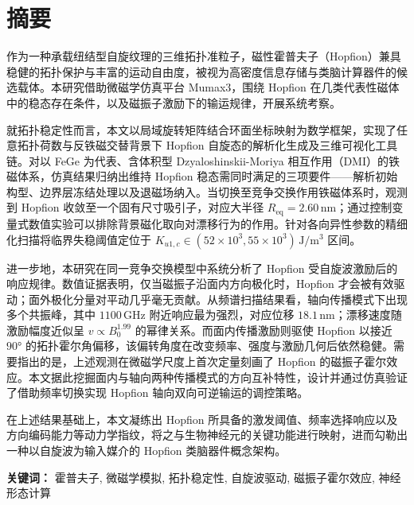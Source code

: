 \documentclass{article}
\begin{document}
\section*{摘\quad 要}

作为一种承载纽结型自旋纹理的三维拓扑准粒子，磁性霍普夫子（Hopfion）兼具稳健的拓扑保护与丰富的运动自由度，被视为高密度信息存储与类脑计算器件的候选载体。本研究借助微磁学仿真平台 Mumax3，围绕 Hopfion 在几类代表性磁体中的稳态存在条件，以及磁振子激励下的输运规律，开展系统考察。

就拓扑稳定性而言，本文以局域旋转矩阵结合环面坐标映射为数学框架，实现了任意拓扑荷数与反铁磁交替背景下 Hopfion 自旋态的解析化生成及三维可视化工具链。对以 FeGe 为代表、含体积型 Dzyaloshinskii-Moriya 相互作用（DMI）的铁磁体系，仿真结果归纳出维持 Hopfion 稳态需同时满足的三项要件——解析初始构型、边界层冻结处理以及退磁场纳入。当切换至竞争交换作用铁磁体系时，观测到 Hopfion 收敛至一个固有尺寸吸引子，对应大半径 $R_{\text{eq}} = 2.60\,\mathrm{nm}$；通过控制变量式数值实验可以排除背景磁化取向对漂移行为的作用。针对各向异性参数的精细化扫描将临界失稳阈值定位于 $K_{u1,c} \in (52\times10^{3}, 55\times10^{3}) \, \mathrm{J/m^3}$ 区间。

进一步地，本研究在同一竞争交换模型中系统分析了 Hopfion 受自旋波激励后的响应规律。数值证据表明，仅当磁振子沿面内方向极化时，Hopfion 才会被有效驱动；面外极化分量对平动几乎毫无贡献。从频谱扫描结果看，轴向传播模式下出现多个共振峰，其中 $1100\,\mathrm{GHz}$ 附近响应最为强烈，对应位移 $18.1\,\mathrm{nm}$；漂移速度随激励幅度近似呈 $v \propto B_0^{1.99}$ 的幂律关系。而面内传播激励则驱使 Hopfion 以接近 $90°$ 的拓扑霍尔角偏移，该偏转角度在改变频率、强度与激励几何后依然稳健。需要指出的是，上述观测在微磁学尺度上首次定量刻画了 Hopfion 的磁振子霍尔效应。本文据此挖掘面内与轴向两种传播模式的方向互补特性，设计并通过仿真验证了借助频率切换实现 Hopfion 轴向双向可逆输运的调控策略。

在上述结果基础上，本文凝练出 Hopfion 所具备的激发阈值、频率选择响应以及方向编码能力等动力学指纹，将之与生物神经元的关键功能进行映射，进而勾勒出一种以自旋波为输入媒介的 Hopfion 类脑器件概念架构。



\textbf{关键词：} 霍普夫子, 微磁学模拟, 拓扑稳定性, 自旋波驱动, 磁振子霍尔效应, 神经形态计算


\end{document}
